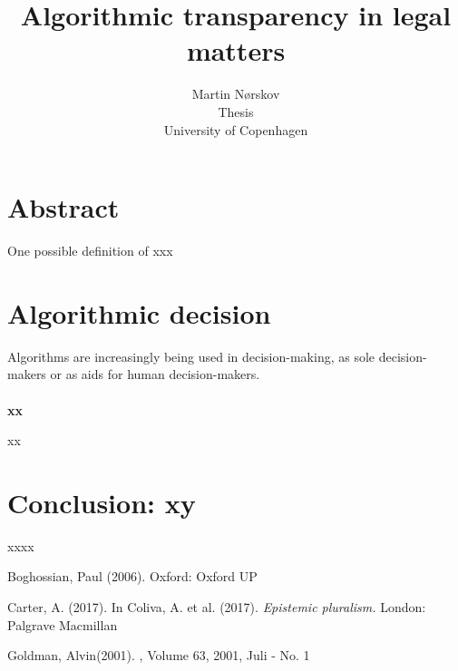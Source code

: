 \documentclass{article}
\title{Algorithmic transparency in legal matters}
\author{Martin Nørskov \\ Thesis \\ University of Copenhagen }
\begin{document}
\maketitle

\newtheorem{definition}{Definition}

\section*{Abstract}

One possible definition of xxx




\section*{Algorithmic decision}
Algorithms are increasingly being used in decision-making, as sole decision-makers or as aids for human decision-makers.
\\
\\
\textbf{xx}

xx

\newpage

\section*{Conclusion: xy}
xxxx

\newpage
\begin{thebibliography}{1}

Boghossian, Paul (2006).
\newblock Oxford: Oxford UP

Carter, A. (2017).
\newblock In Coliva, A. et al. (2017). {\em Epistemic pluralism.}
\newblock London: Palgrave Macmillan

Goldman, Alvin(2001).
, Volume 63, 2001, Juli - No. 1




\end{thebibliography}
\end{document}
